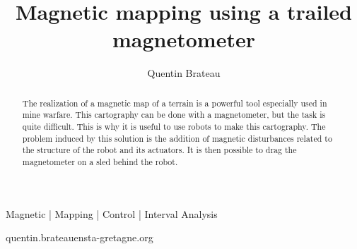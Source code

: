 \documentclass[times, twoside, watermark]{style}
\begin{document}
\title{Magnetic mapping using a trailed magnetometer}

\author[1,\Letter]{Quentin Brateau}


\maketitle

\begin{abstract}
    The realization of a magnetic map of a terrain is a powerful tool especially used in mine warfare. This cartography can be done with a magnetometer, but the task is quite difficult. This is why it is useful to use robots to make this cartography. The problem induced by this solution is the addition of magnetic disturbances related to the structure of the robot and its actuators. It is then possible to drag the magnetometer on a sled behind the robot. 
\end {abstract}

\begin{keywords}
Magnetic | Mapping | Control | Interval Analysis
\end{keywords}

\begin{corrauthor}
quentin.brateau\at ensta-gretagne.org
\end{corrauthor}














% 
\end{document}
